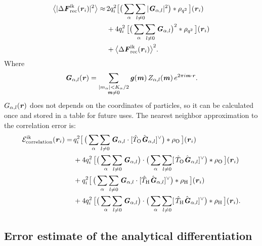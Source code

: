 \documentclass[aps,pre,preprint,unsortedaddress]{revtex4}
\renewcommand{\v}[1]{\textbf{\textit{#1}}}
\begin{document}
\begin{align}\nonumber
  \big\langle
  \vert\Delta\v F_{\textrm{rec}}^{\textrm{ik}}(\v r_i)\vert^2
  \big\rangle
  \approx&\, 
  2q_i^2
  \big[
  \big(
  \sum_{\alpha} \sum_{l\neq 0}
  \vert \v G_{\alpha,l}\vert^2
  \big)
  \ast \rho_{q^2}
  \,\big] (\v r_i)\\\nonumber
  &\,+
  4q_i^2\,
  \big[
  \big(
  \sum_{\alpha} \sum_{l\neq 0}  
  \v G_{\alpha,l}
  \big)^2
  \ast \rho_{q^2}\,
  \big] (\v r_i) \\\label{eqn:ik.error}
  &\,+
  \big\langle
  \Delta\v F_{\textrm{rec}}^{\textrm{ik}}(\v r_i)
  \big\rangle^2.
\end{align}
Where
\begin{align}
  \v G_{\alpha,l}(\v r) =
  \sum_{
    \begin{subarray}{c}
      \vert m_{\alpha}\vert < K_\alpha/2\\
      \v m\neq 0
    \end{subarray}}
  \v g(\v m)\,
  Z_{\alpha,l}(\v m)\,
  e^{2\pi i\v m\cdot\v r}.
\end{align}
$G_{\alpha,l}(\v r)$ does not depends on the coordinates of particles,
so it can be calculated once and stored in a table for future uses.
The nearest neighbor approximation to the correlation error is:
\begin{align}\nonumber
  \mathcal E^{\textrm{ik}}_{\textrm{correlation}}(\v r_i)
  =\,&
  q_i^2
  \big[\,
  \big(
  \sum_{\alpha} \sum_{l\neq 0}
  \v G_{\alpha,l}\cdot[\hat T_{\textrm{O}}\hat{\v G}_{\alpha,l}]^{\vee}
  \big)
  \ast \rho_{\textrm{O}}
  \,\big] (\v r_i) \\\nonumber
  \,&+
  4q_i^2\,
  \big[
  \big(
  \sum_{\alpha} \sum_{l\neq 0}  
  \v G_{\alpha,l}
  \big)
  \cdot
  \big(
  \sum_{\alpha} \sum_{l\neq 0}  
  [\,\hat T_{\textrm{O}}\hat{\v G}_{\alpha,l}]^{\vee}
  \big)
  \ast \rho_{\textrm{O}}\,
  \big] (\v r_i) \\\nonumber
  \,&+
  q_i^2
  \big[\,
  \big(
  \sum_{\alpha} \sum_{l\neq 0}
  \v G_{\alpha,l}\cdot[\hat T_{\textrm{H}}\hat{\v G}_{\alpha,l}]^{\vee}
  \big)
  \ast \rho_{\textrm{H}}
  \,\big] (\v r_i) \\
  \,&+
  4q_i^2\,
  \big[
  \big(
  \sum_{\alpha} \sum_{l\neq 0}  
  \v G_{\alpha,l}
  \big)
  \cdot
  \big(
  \sum_{\alpha} \sum_{l\neq 0}  
  [\,\hat T_{\textrm{H}}\hat{\v G}_{\alpha,l}]^{\vee}
  \big)
  \ast \rho_{\textrm{H}}\,
  \big] (\v r_i).
\end{align}


\subsection{Error estimate of the analytical differentiation}
\label{sec:error-ana}
\end{document}
